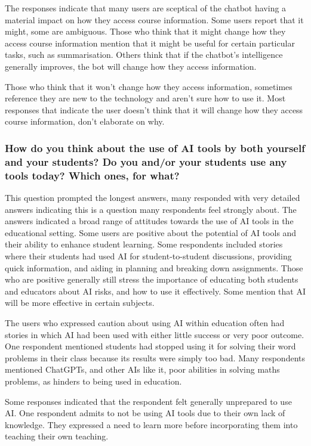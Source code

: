 The responses indicate that many users are sceptical of the chatbot having a material impact on how they access course information. Some users report that it might, some are ambiguous. Those who think that it might change how they access course information mention that it might be useful for certain particular tasks, such as summarisation. Others think that if the chatbot’s intelligence generally improves, the bot will change how they access information.


Those who think that it won’t change how they access information, sometimes reference they are new to the technology and aren’t sure how to use it. Most responses that indicate the user doesn’t think that it will change how they access course information, don't elaborate on why.




\subsubsection{How do you think about the use of AI tools by both yourself and your students? Do you and/or your students use any tools today? Which ones, for what?}


This question prompted the longest answers, many responded with very detailed answers indicating this is a question many respondents feel strongly about. The answers indicated a broad range of attitudes towards the use of AI tools in the educational setting. Some users are positive about the potential of AI tools and their ability to enhance student learning. Some respondents included stories where their students had used AI for student-to-student discussions, providing quick information, and aiding in planning and breaking down assignments. Those who are positive generally still stress the importance of educating both students and educators about AI risks, and how to use it effectively. Some mention that AI will be more effective in certain subjects.


The users who expressed caution about using AI within education often had stories in which AI had been used with either little success or very poor outcome. One respondent mentioned students had stopped using it for solving their word problems in their class because its results were simply too bad. Many respondents mentioned ChatGPTs, and other AIs like it, poor abilities in solving maths problems, as hinders to being used in education.


Some responses indicated that the respondent felt generally unprepared to use AI. One respondent admits to not be using AI tools due to their own lack of knowledge. They expressed a need to learn more before incorporating them into teaching their own teaching.


